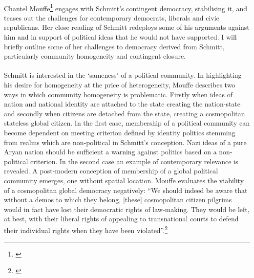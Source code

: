 \documentclass[12pt,a4paper,titlepage]{article}
\begin{document}
\paragraph{}Chantel Mouffe\footnote{\cite{Mouffe:1999,Mouffe:2000fk}} engages with Schmitt's contingent democracy, stabilising it, and teases out the challenges for contemporary democrats, liberals and civic republicans. Her close reading of Schmitt redeploys some of his arguments against him and in support of political ideas that he would not have supported. I will briefly outline some of her challenges to democracy derived from Schmitt, particularly community homogeneity and contingent closure.

\paragraph{}Schmitt is interested in the `sameness' of a political community. In highlighting his desire for homogeneity at the price of heterogeneity, Mouffe describes two ways in which community homogeneity is problematic. Firstly when ideas of nation and national identity are attached to the state creating the nation-state and secondly when citizens are detached from the state, creating a cosmopolitan stateless global citizen. In the first case, membership of a political community can become dependent on meeting criterion defined by identity politics stemming from realms which are non-political in Schmitt's conception. Nazi ideas of a pure Aryan nation should be sufficient a warning against politics based on a non-political criterion. In the second case an example of contemporary relevance is revealed. A post-modern conception of membership of a global political community emerges, one without spatial location. Mouffe evaluates the viability of a cosmopolitan global democracy negatively: ``We should indeed be aware that without a demos to which they belong, [these] cosmopolitan citizen pilgrims would in fact have lost their democratic rights of law-making. They would be left, at best, with their liberal rights of appealing to transnational courts to defend their individual rights when they have been violated''.\footnote{\cite{Mouffe:1999cs}}
\end{document}
